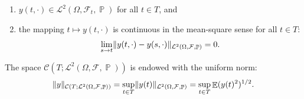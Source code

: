 \documentclass[11pt, a4paper]{article}
\theoremstyle{theoremstyle}
\theoremstyle{definitionstyle}
\DeclareMathOperator{\PP}{\mathbb P}
\DeclareMathOperator{\EE}{\mathbb E}
\DeclarePairedDelimiter{\norm}{\lVert}{\rVert}
\begin{document}
\begin{enumerate}[label=(\alph*)]
    \item $y(t, \cdot) \in \mathcal L^2(\Omega, \mathcal F_t, \PP)$ for all $t \in T$, and
    \item the mapping $t \mapsto y(t, \cdot)$ is continuous in the mean-square sense for all $t \in T$:
    \begin{equation}
        \lim_{s \to t} \norm{y(t, \cdot) - y(s, \cdot)}_{\mathcal L^2(\Omega, \mathcal F, \PP)} = 0.
    \end{equation}
\end{enumerate}
The space $\mathcal C(T; \mathcal L^2(\Omega, \mathcal F, \PP))$ is endowed with the uniform norm:
\begin{equation}
    \norm{y}_{\mathcal C(T; \mathcal L^2(\Omega, \mathcal F, \PP))} = \sup_{t \in T} \norm{y(t)}_{\mathcal L^2(\Omega, \mathcal F, \PP)} = \sup_{t \in T} \EE(y(t)^2)^{1/2}.
\end{equation}
\end{document}
